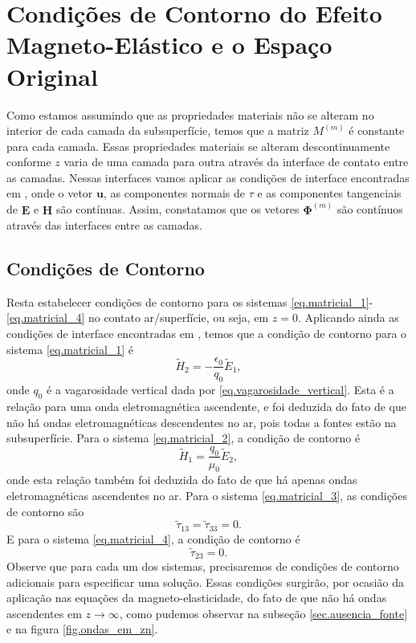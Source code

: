 \chapter{Condi\c{c}\~oes de Contorno do Efeito Magneto-El\'astico e o Espa\c{c}o Original}

Como estamos assumindo que as propriedades materiais n\~ao se alteram no interior de cada camada da subsuperf\'icie, temos que a matriz $M^{(m)}$ \'e constante para cada camada. Essas propriedades materiais se alteram descontinuamente conforme $z$ varia de uma camada para outra atrav\'es da interface de contato entre as camadas. Nessas interfaces vamos aplicar as condi\c{c}\~oes de interface encontradas em \cite{pride_94}, onde o vetor $\mathbf{u}$, as componentes normais de $\tau$ e as componentes  tangenciais de $\mathbf{E}$ e $\mathbf{H}$ s\~ao cont\'inuas. Assim, constatamos que os vetores $\mathbf{\Phi}^{(m)}$ s\~ao cont\'inuos atrav\'es das interfaces entre as camadas.

\section{Condi\c{c}\~oes de Contorno}\label{sec.cond_contorno}
Resta estabelecer condi\c{c}\~oes de contorno para os sistemas \ref{eq.matricial_1}-\ref{eq.matricial_4} no contato ar/superf\'icie, ou seja, em $z=0$. Aplicando ainda as condi\c{c}\~oes de interface encontradas em \cite{pride_94}, temos que a condi\c{c}\~ao de contorno para o sistema \ref{eq.matricial_1} \'e
\begin{equation}\label{eq.cond_fron_1}
\tilde{H}_2=-\frac{\epsilon_0}{q_0}\tilde{E}_1,
\end{equation}
onde $q_0$ \'e a vagarosidade vertical dada por \ref{eq.vagarosidade_vertical}. Esta \'e a rela\c{c}\~ao para uma onda eletromagn\'etica ascendente, e foi deduzida do fato de que n\~ao h\'a ondas eletromagn\'eticas descendentes no ar, pois todas a fontes est\~ao na subsuperf\'icie.
Para o sistema \ref{eq.matricial_2}, a condi\c{c}\~ao de contorno \'e
\begin{equation}\label{eq.cond_fron_2}
\tilde{H}_1=\frac{q_0}{\mu_0}\tilde{E}_2,
\end{equation}
onde esta rela\c{c}\~ao tamb\'em foi deduzida do fato de que h\'a apenas ondas eletromagn\'eticas ascendentes no ar.
Para o sistema \ref{eq.matricial_3}, as condi\c{c}\~oes de contorno s\~ao
\begin{equation}\label{eq.cond_fron_3}
\tilde{\tau}_{13}=\tilde{\tau}_{33}=0.
\end{equation}
E para o sistema \ref{eq.matricial_4}, a condi\c{c}\~ao de contorno \'e
\begin{equation}\label{eq.cond_fron_4}
\tilde{\tau}_{23}=0.
\end{equation}
Observe que para cada um dos sistemas, precisaremos de condi\c{c}\~oes de contorno adicionais para especificar uma solu\c{c}\~ao. Essas condi\c{c}\~oes surgir\~ao, por ocasi\~ao da aplica\c{c}\~ao nas equa\c{c}\~oes da magneto-elasticidade, do fato de que n\~ao h\'a ondas ascendentes em $z\rightarrow\infty$, como pudemos observar na subse\c{c}\~ao \ref{sec.ausencia_fonte} e na figura \ref{fig.ondas_em_zn}.


